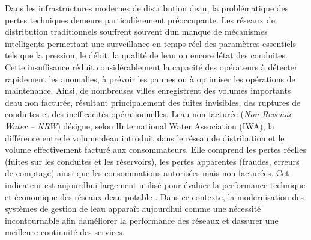 \documentclass[12pt,a4paper,oneside]{report}
\begin{document}
Dans les infrastructures modernes de distribution d\textquotesingle eau,
la problématique des pertes techniques demeure particulièrement
préoccupante. Les réseaux de distribution traditionnels souffrent
souvent d\textquotesingle un manque de mécanismes intelligents
permettant une surveillance en temps réel des paramètres essentiels tels
que la pression, le débit, la qualité de l\textquotesingle eau ou encore
l\textquotesingle état des conduites. Cette insuffisance réduit
considérablement la capacité des opérateurs à détecter rapidement les
anomalies, à prévoir les pannes ou à optimiser les opérations de
maintenance. Ainsi, de nombreuses villes enregistrent des volumes
importants d\textquotesingle eau non facturée, résultant principalement
des fuites invisibles, des ruptures de conduites et des inefficacités
opérationnelles. L\textquotesingle eau non facturée (\emph{Non-Revenue
Water -- NRW}) désigne, selon l\textquotesingle International Water
Association (IWA), la différence entre le volume d\textquotesingle eau
introduit dans le réseau de distribution et le volume effectivement
facturé aux consommateurs. Elle comprend les pertes réelles (fuites sur
les conduites et les réservoirs), les pertes apparentes (fraudes,
erreurs de comptage) ainsi que les consommations autorisées mais non
facturées. Cet indicateur est aujourd\textquotesingle hui largement
utilisé pour évaluer la performance technique et économique des réseaux
d\textquotesingle eau potable \cite{ref6}. Dans ce contexte, la
modernisation des systèmes de gestion de l\textquotesingle eau apparaît
aujourd\textquotesingle hui comme une nécessité incontournable afin
d\textquotesingle améliorer la performance des réseaux et
d\textquotesingle assurer une meilleure continuité des services.
\end{document}
